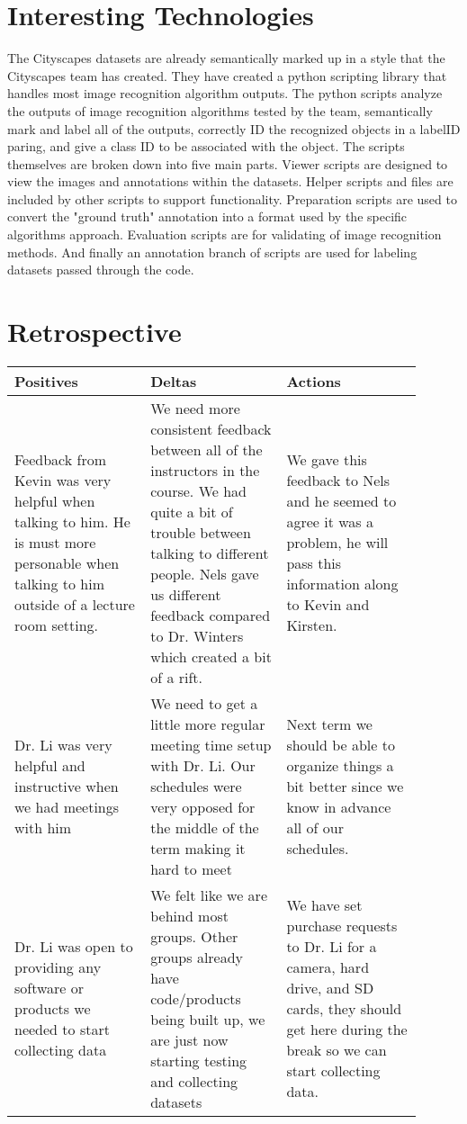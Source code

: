 \documentclass[10pt,draftclsnofoot,onecolumn,journal,compsoc]{IEEEtran}
\begin{document}
\section{Interesting Technologies}
The Cityscapes datasets are already semantically marked up in a style that the Cityscapes team has created.
They have created a python scripting library that handles most image recognition algorithm outputs.
The python scripts analyze the outputs of image recognition algorithms tested by the team, semantically mark and label all of the outputs, correctly ID the recognized objects in a labelID paring, and give a class ID to be associated with the object.
The scripts themselves are broken down into five main parts. 
Viewer scripts are designed to view the images and annotations within the datasets. 
Helper scripts and files are included by other scripts to support functionality. 
Preparation scripts are used to convert the "ground truth" annotation into a format used by the specific algorithms approach. 
Evaluation scripts are for validating of image recognition methods. 
And finally an annotation branch of scripts are used for labeling datasets passed through the code.

\section{Retrospective}

\begin{center}
    \begin{tabular}{ | p{0.3\linewidth} | p{0.3\linewidth} | p{0.3\linewidth} |}
    \hline
     Positives & Deltas & Actions \\ \hline
    Feedback from Kevin was very helpful when talking to him. He is must more personable when talking to him outside of a lecture room setting. & We need more consistent feedback between all of the instructors in the course. We had quite a bit of trouble between talking to different people. Nels gave us different feedback compared to Dr. Winters which created a bit of a rift. & We gave this feedback to Nels and he seemed to agree it was a problem, he will pass this information along to Kevin and Kirsten. \\ \hline
    Dr. Li was very helpful and instructive when we had meetings with him& We need to get a little more regular meeting time setup with Dr. Li. Our schedules were very opposed for the middle of the term making it hard to meet& Next term we should be able to organize things a bit better since we know in advance all of our schedules. \\ \hline
    Dr. Li was open to providing any software or products we needed to start collecting data& We felt like we are behind most groups. Other groups already have code/products being built up, we are just now starting testing and collecting datasets & We have set purchase requests to Dr. Li for a camera, hard drive, and SD cards, they should get here during the break so we can start collecting data. \\ \hline

    
    \hline
    \end{tabular}
\end{center}
\end{document}
